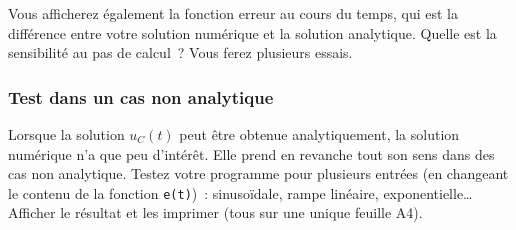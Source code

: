 \documentclass[../main/main.tex]{subfiles}
\begin{document}

Vous afficherez également la fonction erreur au cours du temps, qui est la
différence entre votre solution numérique et la solution analytique. Quelle est
la sensibilité au pas de calcul~? Vous ferez plusieurs essais.

\subsubsection{Test dans un cas non analytique}

Lorsque la solution $u_{C}(t)$ peut être obtenue analytiquement, la solution
numérique n'a que peu d'intérêt. Elle prend en revanche tout son sens dans des
cas non analytique. Testez votre programme pour plusieurs entrées (en changeant
le contenu de la fonction \texttt{e(t)})~: sinusoïdale, rampe linéaire,
exponentielle… Afficher le résultat et les imprimer (tous sur une unique feuille
A4).
\end{document}
